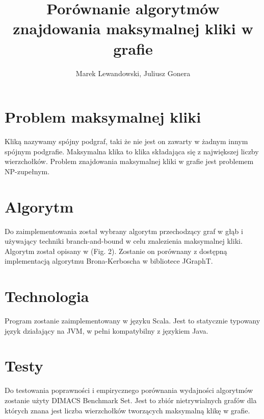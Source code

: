 \documentclass[11pt]{article}
\author{Marek Lewandowski, Juliusz Gonera}
\date{}
\title{Porównanie algorytmów znajdowania maksymalnej kliki w grafie}
\begin{document}
\maketitle

\section{Problem maksymalnej kliki}
\label{sec-1}
Kliką nazywamy spójny podgraf, taki że nie jest on zawarty w żadnym innym spójnym podgrafie. Maksymalna klika to klika składająca się z największej liczby wierzchołków. Problem znajdowania maksymalnej kliki w grafie jest problemem NP-zupełnym.

\section{Algorytm}
\label{sec-2}
Do zaimplementowania został wybrany algorytm przechodzący graf w głąb i używający techniki branch-and-bound w celu znalezienia maksymalnej kliki. Algorytm został opisany w \cite{bioinf} (Fig. 2). Zostanie on porównany z dostępną implementacją algorytmu Brona-Kerboscha w bibliotece JGraphT\cite{jgrapht}.

\section{Technologia}
\label{sec-3}
Program zostanie zaimplementowany w języku Scala. Jest to statycznie typowany język działający na JVM, w pełni kompatybilny z językiem Java.

\section{Testy}
\label{sec-4}
Do testowania poprawności i empirycznego porównania wydajności algorytmów zostanie użyty DIMACS Benchmark Set\cite{dimacs}. Jest to zbiór nietrywialnych grafów dla których znana jest liczba wierzchołków tworzących maksymalną klikę w grafie.

\printbibliography
\end{document}
